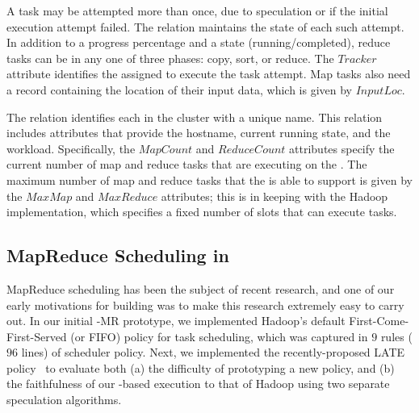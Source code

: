 A task may be attempted more than once, due to speculation or if the initial
execution attempt failed.  The  relation maintains the state of
each such attempt.  In addition to a progress percentage and a state
(running/completed), reduce tasks can be in any one of three phases: copy,
sort, or reduce.  The $Tracker$ attribute identifies the {\TT} assigned to
execute the task attempt.  Map tasks also need a record containing the location
of their input data, which is given by $InputLoc$.

The  relation identifies each {\TT} in the cluster with a
unique name.  This relation includes attributes that provide the hostname,
current running state, and the \TT workload.  Specifically, the $MapCount$ and
$ReduceCount$ attributes specify the current number of map and reduce tasks
that are executing on the \TT.  The maximum number of map and reduce tasks that
the \TT is able to support is given by the $MaxMap$ and $MaxReduce$ attributes;
this is in keeping with the Hadoop implementation, which specifies a fixed
number of slots that can execute tasks.


\subsection{MapReduce Scheduling in \OVERLOG}
\label{ch:boom:sec:scheduler}

MapReduce scheduling has been the subject of recent research, and one of our
early motivations for building \BOOMA was to make this research extremely easy
to carry out.  In our initial \BOOM-MR prototype, we implemented Hadoop's
default First-Come-First-Served (or FIFO) policy for task scheduling, which was
captured in $9$ rules ($96$ lines) of scheduler policy.  Next, we implemented the
recently-proposed LATE policy~\cite{zaharia-late} to evaluate both (a) the
difficulty of prototyping a new policy, and (b) the faithfulness of our
\OVERLOG-based execution to that of Hadoop using two separate speculation
algorithms.

